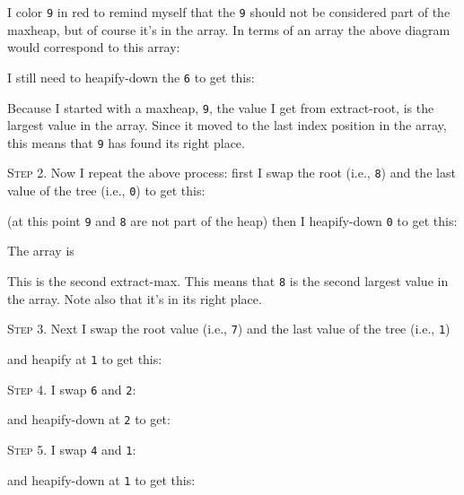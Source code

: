 


I color \texttt{9} in red to remind myself
that the \texttt{9} should not be considered part of the maxheap,
but of course it's in the array.
In terms of an array the above diagram would correspond to this array:



I still need to heapify-down the \texttt{6} to get this:




Because I started with a maxheap, \verb!9!, the value I get from extract-root,
is the largest value in the array.
Since it moved to the last index position in the array,
this means that \verb!9! has found its right place.


\textsc{Step 2}.
Now I repeat the above process:
first I swap the root (i.e., \texttt{8}) and
the last value of the tree (i.e., \texttt{0}) to get this:





(at this point \verb!9! and \verb!8! are not part of the heap)
then I heapify-down \texttt{0} to get this:



The array is



This is the second extract-max.
This means that \verb!8! is the second largest value in the array.
Note also that it's in its right place.


\textsc{Step 3}.
Next I swap the root value (i.e., \texttt{7}) and the last value
of the tree (i.e., \texttt{1})



and heapify at \texttt{1} to get this:




\textsc{Step 4}.
I swap \texttt{6} and \texttt{2}:



and heapify-down at \texttt{2} to get:





\textsc{Step 5}.
I swap \texttt{4} and \texttt{1}:



and heapify-down at \texttt{1} to get this:





